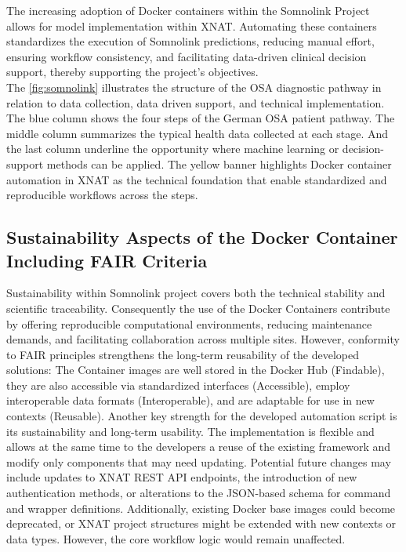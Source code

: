 The increasing adoption of Docker containers within the Somnolink Project allows for model implementation within XNAT. Automating these containers standardizes the execution of Somnolink predictions, reducing manual effort, ensuring workflow consistency, and facilitating data-driven clinical decision support, thereby supporting the project's objectives.\\
The \autoref{fig:somnolink} illustrates the structure of the OSA diagnostic pathway in relation to data collection, data driven support, and technical implementation.
The blue column shows the four steps of the German OSA patient pathway. The middle column summarizes the typical health data collected at each stage. And the last column underline the opportunity where machine learning or decision-support methods can be applied. 
The yellow banner highlights Docker container automation in XNAT as the technical foundation that enable standardized and reproducible workflows across the steps.

\subsection{Sustainability Aspects of the Docker Container Including FAIR Criteria}
Sustainability within Somnolink project covers both the technical stability and scientific traceability. Consequently the use of the Docker Containers contribute by offering reproducible computational environments, reducing maintenance demands, and facilitating collaboration across multiple sites. However, conformity to FAIR principles strengthens the long-term reusability of the developed solutions: The Container images are well stored in the Docker Hub (Findable), they are also accessible via standardized interfaces (Accessible), employ interoperable data formats (Interoperable), and are adaptable for use in new contexts (Reusable). 
Another key strength for the developed automation script is its sustainability and long-term usability. The implementation is flexible and allows at the same time to the developers a reuse of the existing framework and modify only components that may need updating. Potential future changes may include updates to XNAT REST API endpoints, the introduction of new authentication methods, or alterations to the JSON-based schema for command and wrapper definitions. Additionally, existing Docker base images could become deprecated, or XNAT project structures might be extended with new contexts or data types. However, the core workflow logic would remain unaffected.

